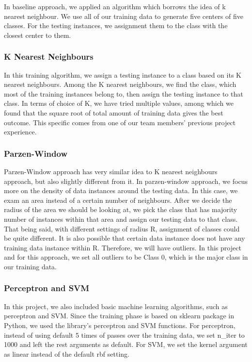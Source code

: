 \documentclass{article} %
\begin{document}
In baseline approach, we applied an algorithm which borrows the idea of k nearest neighbour. We use all of our training data to generate five centers of  five classes. For the testing instances, we assignment them to the class with the closest center to them.

\subsubsection{K Nearest Neighbours}

In this training algorithm, we assign a testing instance to a class based on its K nearest neighbours. Among the K nearest neighbours, we find the class, which most of the training instances belong to, then assign the testing instance to that class. In terms of choice of K, we have tried multiple values, among which we found that the square root of total amount of training data gives the best outcome. This specific comes from one of our team members’ previous project experience.

\subsubsection{Parzen-Window}

Parzen-Window approach has very similar idea to K nearest neighbours approach, but also slightly different from it. In parzen-window approach, we focus more on the density of data instances around the testing data. In this case, we exam an area instead of a certain number of neighbours. After we decide the radius of the area we should be looking at, we pick the class that has majority number of instances within that area and assign our testing data to that class. That being said, with different settings of radius R, assignment of classes could be quite different. It is also possible that certain data instance does not have any training data instance within R. Therefore, we will have outliers. In this project and for this approach, we set all outliers to be Class 0, which is the major class in our training data.

\subsubsection{Perceptron and SVM}

In this project, we also included basic machine learning algorithms, such as perceptron and SVM. Since the training phase is based on sklearn package in Python, we used the library’s perceptron and SVM functions. For perceptron, instead of using default 5 times of passes over the training data, we set n\_iter to 1000 and left the rest arguments as default. For SVM, we set the kernel argument as linear instead of the default rbf setting.
\end{document}
